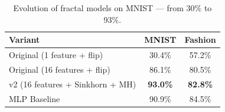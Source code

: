 \begin{table}[h]
\centering
\caption{Evolution of fractal models on MNIST --- from 30\% to 93\%.}
\begin{tabular}{lcc}
\hline
\textbf{Variant} & \textbf{MNIST} & \textbf{Fashion} \\
\hline
Original (1 feature + flip)             & 30.4\% & 57.2\% \\
Original (16 features + flip)             & 86.1\% & 80.5\% \\
v2 (16 features + Sinkhorn + MH)          & \textbf{93.0\%} & \textbf{82.8\%} \\
MLP Baseline                          & 90.9\% & 84.5\% \\
\hline
\end{tabular}
\end{table}
